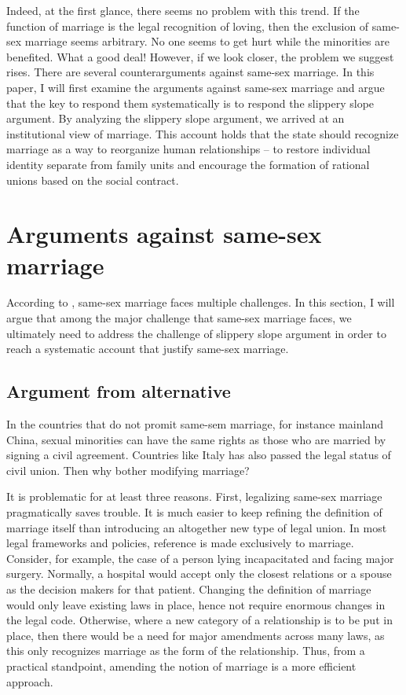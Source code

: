 \documentclass[man,floatsintext]{apa7}
\begin{document}
Indeed, at the first glance, there seems no problem with this trend. If the function of marriage is the legal recognition of loving, then the exclusion of same-sex marriage seems arbitrary. No one seems to get hurt while the minorities are benefited. What a good deal! However, if we look closer, the problem we suggest rises. There are several counterarguments against same-sex marriage. In this paper, I will first examine the arguments against same-sex marriage and argue that the key to respond them systematically is to respond the slippery slope argument. By analyzing the slippery slope argument, we arrived at an institutional view of marriage. This account holds that the state should recognize marriage as a way to reorganize human relationships -- to restore individual identity separate from family units and encourage the formation of rational unions based on the social contract.

\section{Arguments against same-sex marriage}

According to \textcite{brakeMarriageDomesticPartnership2023}, same-sex marriage faces multiple challenges. In this section, I will argue that among the major challenge that same-sex marriage faces,  we ultimately need to address the challenge of slippery slope argument in order to reach a systematic account that justify same-sex marriage.

\subsection{Argument from alternative}
\label{alternative}

In the countries that do not promit same-sem marriage, for instance mainland China, sexual minorities can have the same rights as those who are married by signing a civil agreement. Countries like Italy has also passed the legal status of civil union.\autocite{povoledoItalyApprovesSameSex2016} Then why bother modifying marriage? 

It is problematic for at least three reasons. First, legalizing same-sex marriage pragmatically saves trouble. It is much easier to keep refining the definition of marriage itself than introducing an altogether new type of legal union. In most legal frameworks and policies, reference is made exclusively to marriage. Consider, for example, the case of a person lying incapacitated and facing major surgery. Normally, a hospital would accept only the closest relations or a spouse as the decision makers for that patient. Changing the definition of marriage would only leave existing laws in place, hence not require enormous changes in the legal code. Otherwise, where a new category of a relationship is to be put in place, then there would be a need for major amendments across many laws, as this only recognizes marriage as the form of the relationship. Thus, from a practical standpoint, amending the notion of marriage is a more efficient approach. 
\end{document}
